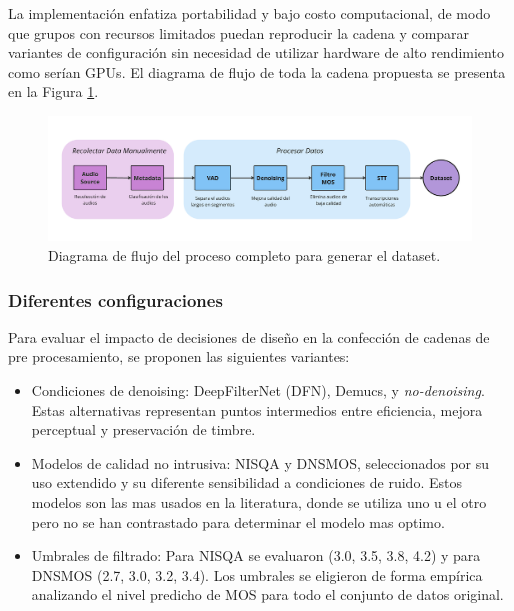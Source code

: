La implementación enfatiza portabilidad y bajo costo computacional, de modo que grupos con recursos limitados puedan reproducir la cadena y comparar variantes de configuración sin necesidad de utilizar hardware de alto rendimiento como serían GPUs. El diagrama de flujo de toda  la cadena propuesta se presenta en la Figura \ref{fig:pipeline_flowchart}.

\begin{figure}[h]
  \centering
  \centerline{\includegraphics[width=18cm]{Figuras/Desarrollo/diagrama_flujo_cadena.PNG}}
  \caption{Diagrama de flujo del proceso completo para generar el dataset.}
    \label{fig:pipeline_flowchart}
\end{figure}

\subsubsection{Diferentes configuraciones}

Para evaluar el impacto de decisiones de diseño en la confección de cadenas de pre procesamiento, se proponen las siguientes variantes:

\begin{itemize}
    \item Condiciones de denoising: DeepFilterNet (DFN), Demucs, y \emph{no-denoising}. Estas alternativas representan puntos intermedios entre eficiencia, mejora perceptual y preservación de timbre. 
    \item Modelos de calidad no intrusiva: NISQA y DNSMOS, seleccionados por su uso extendido y su diferente sensibilidad a condiciones de ruido. Estos modelos son las mas usados en la literatura, donde se utiliza uno u el otro pero no se han contrastado para determinar el modelo mas optimo. 
    \item Umbrales de filtrado: Para NISQA se evaluaron (3.0, 3.5, 3.8, 4.2) y para DNSMOS (2.7, 3.0, 3.2, 3.4). Los umbrales se eligieron de forma empírica analizando el nivel predicho de MOS para todo el conjunto de datos original. 
\end{itemize}

